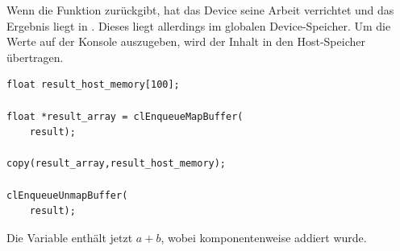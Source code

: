 Wenn die Funktion zurückgibt, hat das Device seine Arbeit verrichtet und das
Ergebnis liegt in . Dieses  liegt allerdings im globalen Device-Speicher. Um die Werte
\PimiddyzB auf der Konsole auszugeben, wird der Inhalt in den
Host-Speicher übertragen.

\begin{verbatim}
float result_host_memory[100];

float *result_array = clEnqueueMapBuffer(
    result);

copy(result_array,result_host_memory);

clEnqueueUnmapBuffer(
    result);
\end{verbatim}

Die Variable  enthält jetzt
$a+b$, wobei komponentenweise addiert wurde.
